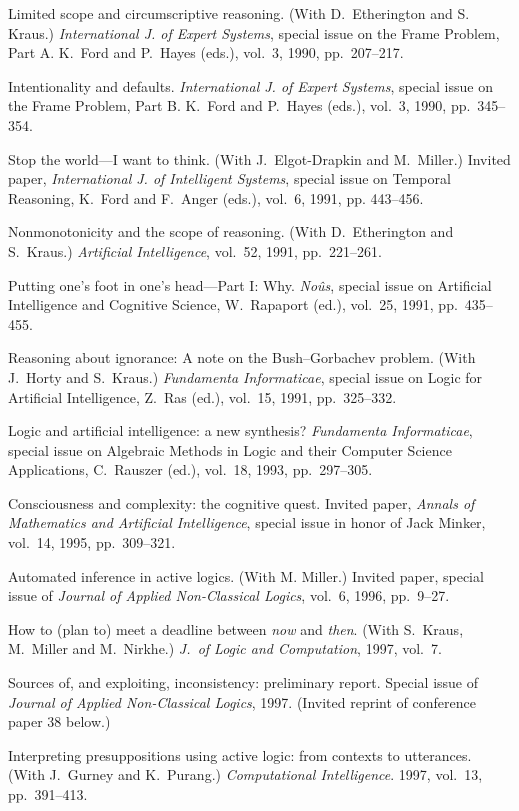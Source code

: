 \paper
Limited scope and circumscriptive reasoning.
(With D.~Etherington and S.~ Kraus.)
{\sl International J. of Expert Systems},
special issue on the Frame Problem, Part A.
K.~Ford and P.~Hayes (eds.),
vol.~3, 1990, pp.~207--217.

\paper
Intentionality and defaults.
{\sl International J. of Expert Systems},
special issue on the Frame Problem, Part B.
K.~Ford and P.~Hayes (eds.), 
vol.~3, 1990, pp.~345--354.

\paper
Stop the world---I want to think.
(With J.~Elgot-Drapkin and M.~Miller.)
Invited paper, {\sl International J. of Intelligent Systems},
special issue on Temporal Reasoning, K.~Ford and F.~Anger (eds.),
vol.~6, 1991, pp. 443--456.

\paper
Nonmonotonicity and the scope of reasoning.
(With D.~Etherington and S.~Kraus.)
{\sl Artificial Intelligence},
vol.~52, 1991, pp.~221--261.

\paper
Putting one's foot in one's head---Part I: Why.
{\sl No\^{u}s},
special issue on Artificial Intelligence and Cognitive Science,
W.~Rapaport (ed.), vol.~25, 1991, pp.~435--455.

\paper
Reasoning about ignorance: A note on the Bush--Gorbachev problem.
(With J.~Horty and S.~Kraus.)
{\sl Fundamenta Informaticae},
special issue on Logic for Artificial Intelligence,
Z.~Ras (ed.), vol.~15, 1991, pp.~325--332.

\paper
Logic and artificial intelligence: a new synthesis?
{\sl Fundamenta Informaticae},
special issue on Algebraic Methods in Logic and their Computer Science
Applications, C.~Rauszer (ed.), vol.~18, 1993, pp.~297--305.

\paper
Consciousness and complexity: the cognitive quest. Invited paper,
{\sl Annals of Mathematics and Artificial Intelligence}, special issue in
honor of Jack Minker, vol.~14, 1995, pp.~309--321.

\paper
Automated inference in active logics.
(With M. Miller.) Invited paper, special issue of {\sl Journal
of Applied Non-Classical Logics}, vol.~6, 1996, pp.~9--27.

\paper
How to (plan to) meet a deadline between {\sl now} and {\sl then}.
(With S.~Kraus, M.~Miller and M.~Nirkhe.) {\sl J.~of Logic and Computation},
1997, vol.~7.

\paper
Sources of, and exploiting, inconsistency: preliminary report.
Special issue of {\sl Journal of Applied Non-Classical Logics}, 1997.
(Invited reprint of conference paper 38 below.)

\paper
Interpreting presuppositions using active logic: from contexts to
utterances.
(With J.~Gurney and K.~Purang.) {\sl Computational Intelligence}.
1997, vol.~13, pp.~391--413.

